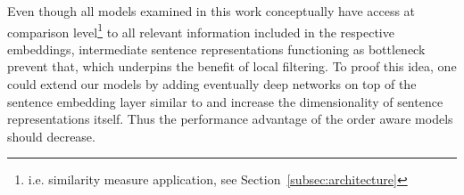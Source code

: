
Even though all models examined in this work conceptually have access at comparison level\footnote{i.e. similarity measure application, see Section~\ref{subsec:architecture}} to all relevant information included in the respective embeddings, intermediate sentence representations functioning as bottleneck prevent that, which underpins the benefit of local filtering. To proof this idea, one could extend our models by adding eventually deep networks on top of the sentence embedding layer similar to \textcite{iyyer_deep_2015} and increase the dimensionality of sentence representations itself. Thus the performance advantage of the order aware models should decrease.


